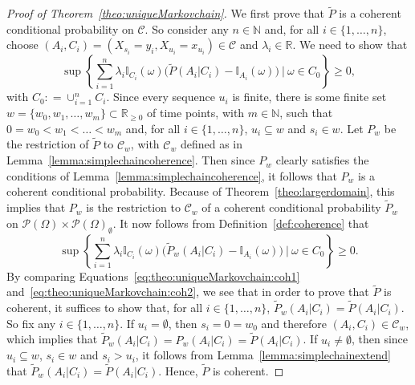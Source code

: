 \documentclass[10pt]{paper}
\theoremstyle{definition}
\newcommand{\nats}{\mathbb{N}}
\newcommand{\reals}{\mathbb{R}}
\newcommand{\paths}{\Omega}
\newcommand{\power}{\mathcal{P}(\paths)}
\newcommand{\nonemptypower}{\power_{\emptyset}}
\newcommand{\ind}[1]{\mathbb{I}_{#1}}
\newcommand{\coloneqq}{:\!=}
\begin{document}
\begin{proof}[Proof of Theorem~\ref{theo:uniqueMarkovchain}]
We first prove that $\tilde{P}$ is a coherent conditional probability on $\mathcal{C}$. So consider any $n\in\nats$ and, for all $i\in\{1,\dots,n\}$, choose $(A_i,C_i)=(X_{s_i}=y_i,X_{u_i}=x_{u_i})\in\mathcal{C}$ and $\lambda_i\in\reals$. We need to show that
\begin{equation}\label{eq:theo:uniqueMarkovchain:coh1}
\sup\left\{\sum_{i=1}^n\lambda_i\ind{C_i}(\omega)\bigl(\tilde{P}(A_i\vert C_i)-\ind{A_i}(\omega)\bigr)~\Bigg\vert~\omega\in C_0\right\}\geq0,
\end{equation}
with $C_0\coloneqq\cup_{i=1}^nC_i$.
Since every sequence $u_i$ is finite, there is some finite set $w=\{w_0,w_1,\dots,w_m\}\subset\reals_{\geq0}$ of time points, with $m\in\nats$, such that $0=w_0<w_1<\dots<w_m$ and, for all $i\in\{1,\dots,n\}$, $u_i\subseteq w$ and $s_i\in w$.
Let $P_w$ be the restriction of $\tilde{P}$ to $\mathcal{C}_w$, with $\mathcal{C}_w$ defined as in Lemma~\ref{lemma:simplechaincoherence}. Then since $P_w$ clearly satisfies the conditions of Lemma~\ref{lemma:simplechaincoherence}, it follows that $P_w$ is a coherent conditional probability. Because of Theorem~\ref{theo:largerdomain}, this implies that $P_w$ is the restriction to $\mathcal{C}_w$ of a coherent conditional probability $\tilde{P}_w$ on $\power\times\nonemptypower$. It now follows from Definition~\ref{def:coherence} that
\begin{equation}\label{eq:theo:uniqueMarkovchain:coh2}
\sup\left\{\sum_{i=1}^n\lambda_i\ind{C_i}(\omega)\bigl(\tilde{P}_w(A_i\vert C_i)-\ind{A_i}(\omega)\bigr)~\Bigg\vert~\omega\in C_0\right\}\geq0.
\end{equation}
By comparing Equations~\eqref{eq:theo:uniqueMarkovchain:coh1} and~\eqref{eq:theo:uniqueMarkovchain:coh2}, we see that in order to prove that $\tilde{P}$ is coherent, it suffices to show that, for all $i\in\{1,\dots,n\}$, $\tilde{P}_w(A_i\vert C_i)=\tilde{P}(A_i\vert C_i)$. So fix any $i\in\{1,\dots,n\}$. If $u_i=\emptyset$, then $s_i=0=w_0$ and therefore $(A_i,C_i)\in\mathcal{C}_w$, which implies that $\tilde{P}_w(A_i\vert C_i)=P_w(A_i\vert C_i)=\tilde{P}(A_i\vert C_i)$. If $u_i\neq\emptyset$, then since $u_i\subseteq w$, $s_i\in w$ and $s_i>u_i$, it follows from Lemma~\ref{lemma:simplechainextend} that $\tilde{P}_w(A_i\vert C_i)=\tilde{P}(A_i\vert C_i)$. Hence, $\tilde{P}$ is coherent.




\end{proof}
\end{document}
